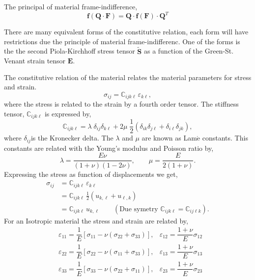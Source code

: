 \documentclass[11pt, a4paper]{article}
\numberwithin{equation}{section}
\begin{document}
The principal of material frame-indifference,
\begin{equation}
\boldsymbol f (\boldsymbol Q \cdot \boldsymbol F) = \boldsymbol Q \cdot \boldsymbol f(\boldsymbol F)\cdot \boldsymbol Q^T
\end{equation}

There are many equivalent forms of the constitutive relation, each form will have restrictions due the principle of material frame-indifferenc. One of the forms is the the second Piola-Kirchhoff stress tensor $\tilde{\boldsymbol S}$ as a function of the Green-St. Venant strain tensor $\boldsymbol E$.

The constitutive relation of the material relates the material parameters for stress and strain.
\begin{equation}
\sigma_{ij} = \mathbb{C}_{ijk\ell} \, \varepsilon_{k\ell},
\end{equation}
where the stress is related to the strain by a fourth order tensor. The stiffness tensor, $\mathbb{C}_{ijk\ell} $ is expressed by,
\begin{equation}
\mathbb{C}_{ijk\ell} = \lambda \; \delta_{ij} \delta_{k\ell} + 2 \mu \;
 \dfrac{1}{2} (\delta_{ik} \delta_{j\ell} + \delta_{i\ell} \delta_{jk}),
\end{equation}
where $\delta_{ij}$is the Kronecker delta. The $\lambda$ and $\mu$ are known as Lam$\acute{\text{e}}$ constants. This constants are related with the Young's modulus and Poisson ratio by, 
\begin{equation*}
\lambda = \dfrac{E \nu}{(1+\nu)(1-2\nu)}, \qquad \mu = \dfrac{E}{2(1+\nu)}.
\end{equation*}
Expressing the stress as function of displacements we get,
\begin{align*}
\sigma_{ij} &= \mathbb{C}_{ijk\ell} \, \varepsilon_{k\ell} \\
&=\mathbb{C}_{ijk\ell} \, \frac{1}{2} ( u_{k,\ell} + u_{\ell,k}) \\
&=  \mathbb{C}_{ijk\ell} \,  u_{k,\ell} \qquad (\text{Due symetry }\mathbb{C}_{ijk\ell} =\mathbb{C}_{ij\ell k}).
\end{align*}
For an Isotropic material the stress and strain are related by,
\begin{align*}
&\varepsilon_{11} = \dfrac{1}{E} [\sigma_{11} - \nu (\sigma_{22}+\sigma_{33})], &\varepsilon_{12} = \dfrac{1 + \nu}{E} \sigma_{12} \\
&
\varepsilon_{22} = \dfrac{1}{E} [\sigma_{22} - \nu (\sigma_{11}+\sigma_{33})], & \varepsilon_{13} = \dfrac{1 + \nu}{E} \sigma_{13}\\&
\varepsilon_{33} = \dfrac{1}{E} [\sigma_{33} - \nu (\sigma_{22}+\sigma_{11})], & 
\varepsilon_{23} = \dfrac{1 + \nu}{E} \sigma_{23}
\end{align*}
\end{document}
